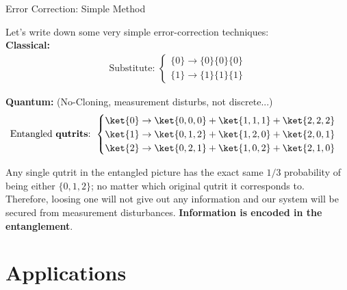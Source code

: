 \documentclass[9pt, handout, aspectratio=169]{beamer}		%
\begin{document}

	\begin{frame}{Error Correction: Simple Method}

		Let's write down some very simple error-correction techniques: \\

		\vspace{10pt}
		\textbf{Classical:} \\
		\vspace{-10pt}
		\begin{align*}
		\text{Substitute:  }
		\begin{cases}
			\lbrace 0 \rbrace \rightarrow \lbrace 0 \rbrace \lbrace 0 \rbrace \lbrace 0 \rbrace \\
			\lbrace 1 \rbrace \rightarrow \lbrace 1 \rbrace \lbrace 1 \rbrace \lbrace 1 \rbrace
		\end{cases}
		\end{align*}

		\pause

		\textbf{Quantum:} (No-Cloning, measurement disturbs, not discrete...) \\
		\vspace{-4pt}
		\begin{align*}
		\text{Entangled \textbf{qutrits}:  }
		\begin{cases}
			\ket{0} \rightarrow \ket{0,0,0} + \ket{1,1,1} + \ket{2,2,2} \\
			\ket{1} \rightarrow \ket{0,1,2} + \ket{1,2,0} + \ket{2,0,1} \\
			\ket{2} \rightarrow \ket{0,2,1} + \ket{1,0,2} + \ket{2,1,0}
		\end{cases}
		\end{align*}

		\vspace{-0pt}
		Any single qutrit in the entangled picture has the exact same $1/3$ probability of being either $\lbrace 0,1,2 \rbrace$; no matter which original qutrit it corresponds to. Therefore, loosing one will not give out any information and our system will be secured from measurement disturbances. \textbf{Information is encoded in the entanglement}.

	\end{frame}


\section{Applications}
\end{document}
